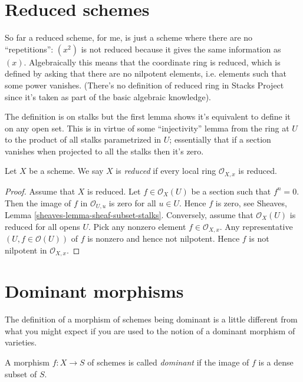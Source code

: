 \section{Reduced schemes}
\label{section-reduced}

\noindent
So far a reduced scheme,
for me,
is just a scheme where there are
no ``repetitions'':
$(x^2)$ is not reduced because
it gives the same information as $(x)$.
Algebraically this means that the
coordinate ring is reduced,
which is defined by asking
that there are no nilpotent elements,
i.e. elements such that some power vanishes.
(There's no definition of reduced ring in Stacks Project
since it's taken as part of the basic algebraic knowledge).

The definition is on stalks but the first lemma
shows it's equivalent to define it on any open set.
This is in virtue of some ``injectivity'' lemma
from the ring at $U$ to the product of all stalks parametrized in $U$;
essentially that if a section vanishes when projected to all
the stalks then it's zero.

\begin{definition}
\label{definition-reduced}
Let $X$ be a scheme. We say $X$ is {\it reduced} if every local ring
$\mathcal{O}_{X, x}$ is reduced.
\end{definition}


\begin{proof}
Assume that $X$ is reduced.
Let $f \in \mathcal{O}_X(U)$ be a section such that $f^n = 0$.
Then the image of $f$ in $\mathcal{O}_{U, u}$ is zero for
all $u \in U$. Hence $f$ is zero, see
Sheaves, Lemma \ref{sheaves-lemma-sheaf-subset-stalks}.
Conversely, assume that $\mathcal{O}_X(U)$ is reduced
for all opens $U$. Pick any nonzero element $f \in \mathcal{O}_{X, x}$.
Any representative $(U, f \in \mathcal{O}(U))$  of $f$ is nonzero and
hence not nilpotent. Hence $f$ is not nilpotent in $\mathcal{O}_{X, x}$.
\end{proof}

\section{Dominant morphisms}
\label{section-dominant}

\noindent
The definition of a morphism of schemes being dominant is a little
different from what you might expect if you are used to the notion
of a dominant morphism of varieties.

\begin{definition}
\label{definition-dominant}
A morphism $f : X \to S$ of schemes is called {\it dominant} if the
image of $f$ is a dense subset of $S$.
\end{definition}

